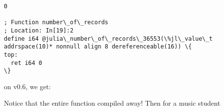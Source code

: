 \documentclass[11pt]{article}
\newenvironment{Shaded}{}{}
\newcommand{\DataTypeTok}[1]{\textcolor[rgb]{0.56,0.13,0.00}{{#1}}}
\newcommand{\FloatTok}[1]{\textcolor[rgb]{0.25,0.63,0.44}{{#1}}}
\newcommand{\CommentTok}[1]{\textcolor[rgb]{0.38,0.63,0.69}{\textit{{#1}}}}
\newcommand{\NormalTok}[1]{{#1}}
\begin{document}
    \begin{Verbatim}[commandchars=\\\{\}]
0

; Function number\_of\_records
; Location: In[19]:2
define i64 @julia\_number\_of\_records\_36553(\%jl\_value\_t addrspace(10)* nonnull align 8 dereferenceable(16)) \{
top:
  ret i64 0
\}

    \end{Verbatim}

    on v0.6, we get:

\begin{Shaded}
\end{Shaded}

Notice that the entire function compiled away! Then for a music student
\end{document}
